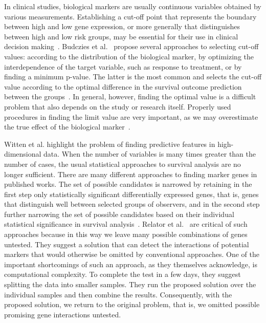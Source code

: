 \documentclass[11pt,a4paper]{article}
\begin{document}
In clinical studies, biological markers are usually continuous variables obtained by various measurements. Establishing a cut-off point that represents the boundary between high and low gene expression, or more generally that distinguishes between high and low risk groups, may be essential for their use in clinical decision making~\cite{mazumdar2000categorizing}. Budczies et al.~\cite{budczies2012cutoff} propose several  approaches to selecting cut-off values: according to the distribution of the biological marker, by optimizing the interdependence of the target variable, such as response to treatment, or by finding a minimum p-value. The latter is the most common and selects the cut-off value according to the optimal difference in the survival outcome prediction between the groups~\cite{woo2020determination}. In general, however, finding the optimal value is a difficult problem that also depends on the study or research itself. Properly used procedures in finding the limit value are very important, as we may overestimate the true effect of the biological marker~\cite{Altman1991}.

Witten et al.\cite{witten2010survival} highlight the problem of finding predictive features in high-dimensional data. When the number of variables is many times greater than the number of cases, the usual statistical approaches to survival analysis are no longer sufficient. There are many different approaches to finding marker genes in published works. The set of possible candidates is narrowed by retaining in the first step only statistically significant differentially expressed genes, that is, genes that distinguish well between selected groups of observers, and in the second step further narrowing the set of possible candidates based on their individual statistical significance in survival analysis~\cite{wang2017identification,liao2018identification,zhang2011discovery,kim2013identification}. Relator et al.~\cite{relator2018identifying} are critical of such approaches because in this way we leave many possible combinations of genes untested. They suggest a solution that can detect the interactions of potential markers that would otherwise be omitted by conventional approaches. One of the important shortcomings of such an approach, as they themselves acknowledge, is computational complexity. To complete the test in a few days, they suggest splitting the data into smaller samples. They run the proposed solution over the individual samples and then combine the results. Consequently, with the proposed solution, we return to the original problem, that is, we omitted possible promising gene interactions untested.
\end{document}
